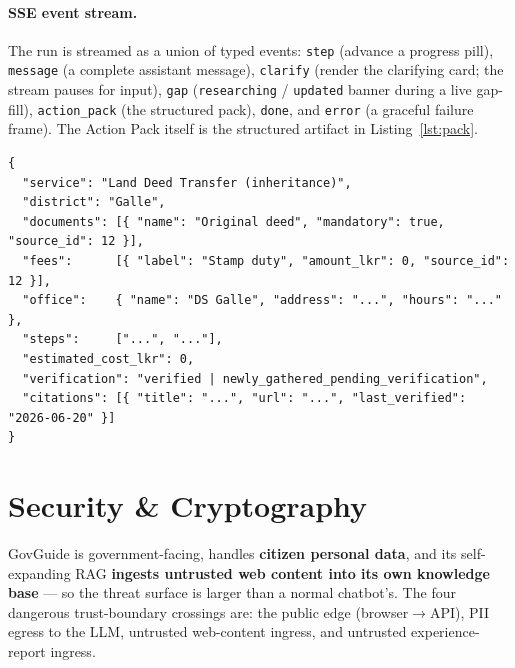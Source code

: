 \documentclass[11pt,a4paper]{article}
\begin{document}
\paragraph{SSE event stream.} The run is streamed as a union of typed events: \texttt{step}
(advance a progress pill), \texttt{message} (a complete assistant message), \texttt{clarify} (render
the clarifying card; the stream pauses for input), \texttt{gap} (\texttt{researching} / \texttt{updated}
banner during a live gap-fill), \texttt{action\_pack} (the structured pack), \texttt{done}, and
\texttt{error} (a graceful failure frame). The Action Pack itself is the structured artifact in
Listing~\ref{lst:pack}.

\begin{lstlisting}[caption={The Action Pack (A6 output) --- every fact traces to a source.},label={lst:pack}]
{
  "service": "Land Deed Transfer (inheritance)",
  "district": "Galle",
  "documents": [{ "name": "Original deed", "mandatory": true, "source_id": 12 }],
  "fees":      [{ "label": "Stamp duty", "amount_lkr": 0, "source_id": 12 }],
  "office":    { "name": "DS Galle", "address": "...", "hours": "..." },
  "steps":     ["...", "..."],
  "estimated_cost_lkr": 0,
  "verification": "verified | newly_gathered_pending_verification",
  "citations": [{ "title": "...", "url": "...", "last_verified": "2026-06-20" }]
}
\end{lstlisting}

\section{Security \& Cryptography}
\label{sec:security}

GovGuide is government-facing, handles \textbf{citizen personal data}, and its self-expanding RAG
\textbf{ingests untrusted web content into its own knowledge base} --- so the threat surface is larger
than a normal chatbot's. The four dangerous trust-boundary crossings are: the public edge
(browser$\to$API), PII egress to the LLM, untrusted web-content ingress, and untrusted
experience-report ingress.
\end{document}
